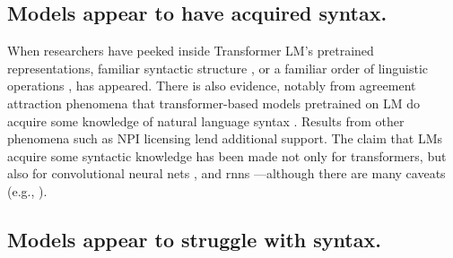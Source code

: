\documentclass[letterpaper, 12pt]{report}
\begin{document}
\subsection{Models appear to have acquired syntax.}

When researchers have peeked inside Transformer LM's pretrained representations, familiar syntactic structure \citep{hewitt-manning-2019-structural,jawahar-etal-2019-bert, lin-etal-2019-open, warstadt-bowman-2020-can, wu-etal-2020-perturbed}, or a familiar order of linguistic operations \citep{jawahar-etal-2019-bert,  tenney-etal-2019-bert}, has appeared. There is also evidence, notably from agreement attraction phenomena \citep{linzen-etal-2016-assessing} that transformer-based models pretrained on LM do acquire some knowledge of natural language syntax \citep{gulordava-etal-2018-colorless, chrupala-alishahi-2019-correlating,  jawahar-etal-2019-bert, lin-etal-2019-open, manning-etal-2020-emergent,  hawkins-etal-2020-investigating, linzen-baroni-2021-syntactic}. Results from other phenomena \citep{warstadt-bowman-2020-can} such as NPI licensing  \citep{warstadt-etal-2019-investigating} lend additional support. The claim that LMs acquire some syntactic knowledge has been made not only for transformers, but also for convolutional neural nets \citep{bernardy-lappin-2017-using}, and \acrshort{rnn}s \citep{gulordava-etal-2018-colorless, van-schijndel-linzen-2018-neural, wilcox-etal-2018-rnn, zhang-bowman-2018-language, prasad-etal-2019-using, ravfogel-etal-2019-studying}---although there are many caveats (e.g., \citealt{ravfogel-etal-2018-lstm, white-etal-2018-lexicosyntactic,  davis-van-schijndel-2020-recurrent, chaves-2020-dont, da-costa-chaves-2020-assessing, kodner-gupta-2020-overestimation}).

\subsection{Models appear to struggle with syntax.}
\end{document}
